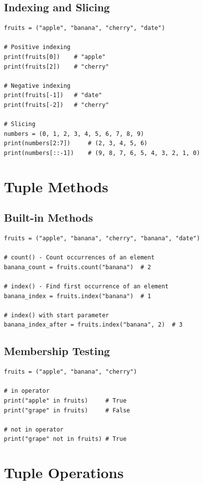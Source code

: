 \documentclass[12pt,a4paper]{article}
\begin{document}
\subsection{Indexing and Slicing}

\begin{lstlisting}
fruits = ("apple", "banana", "cherry", "date")

# Positive indexing
print(fruits[0])    # "apple"
print(fruits[2])    # "cherry"

# Negative indexing
print(fruits[-1])   # "date"
print(fruits[-2])   # "cherry"

# Slicing
numbers = (0, 1, 2, 3, 4, 5, 6, 7, 8, 9)
print(numbers[2:7])     # (2, 3, 4, 5, 6)
print(numbers[::-1])    # (9, 8, 7, 6, 5, 4, 3, 2, 1, 0)
\end{lstlisting}

\section{Tuple Methods}

\subsection{Built-in Methods}

\begin{lstlisting}
fruits = ("apple", "banana", "cherry", "banana", "date")

# count() - Count occurrences of an element
banana_count = fruits.count("banana")  # 2

# index() - Find first occurrence of an element
banana_index = fruits.index("banana")  # 1

# index() with start parameter
banana_index_after = fruits.index("banana", 2)  # 3
\end{lstlisting}

\subsection{Membership Testing}

\begin{lstlisting}
fruits = ("apple", "banana", "cherry")

# in operator
print("apple" in fruits)     # True
print("grape" in fruits)     # False

# not in operator
print("grape" not in fruits) # True
\end{lstlisting}

\section{Tuple Operations}
\end{document}

